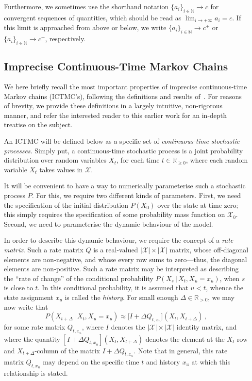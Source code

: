 \documentclass[3p]{elsarticle}
\newcommand{\nats}{\mathbb{N}}
\newcommand{\reals}{\mathbb{R}}
\newcommand{\realspos}{\reals_{>0}}
\newcommand{\realsnonneg}{\reals_{\geq 0}}
\newcommand{\states}{\mathcal{X}}
\begin{document}
Furthermore, we sometimes use the shorthand notation $\{a_i\}_{i\in\nats}\to c$ for convergent sequences of quantities, which should be read as $\lim_{i\to+\infty}a_i=c$. If this limit is approached from above or below, we write $\{a_i\}_{i\in\nats}\to c^+$ or $\{a_i\}_{i\in\nats}\to c^-$, respectively.


\subsection{Imprecise Continuous-Time Markov Chains}\label{subsec:ictmc}

We here briefly recall the most important properties of imprecise continuous-time Markov chains (ICTMC's), following the definitions and results of~\citet{krak2016ictmc}. For reasons of brevity, we provide these definitions in a largely intuitive, non-rigorous manner, and refer the interested reader to this earlier work for an in-depth treatise on the subject.

An ICTMC will be defined below as a specific set of \emph{continuous-time stochastic processes}. Simply put, a continuous-time stochastic process is a joint probability distribution over random variables $X_t$, for each time $t\in\realsnonneg$, where each random variable $X_t$ takes values in $\states$. 


It will be convenient to have a way to numerically parameterise such a stochastic process $P$. For this, we require two different kinds of parameters. First, we need the specification of the initial distribution $P(X_0)$ over the state at time zero; this simply requires the specification of some probability mass function on $\states_0$. Second, we need to parameterise the dynamic behaviour of the model.

In order to describe this dynamic behaviour, we require the concept of a \emph{rate matrix}. Such a rate matrix $Q$ is a real-valued $\lvert\states\rvert\times\lvert\states\rvert$ matrix, whose off-diagonal elements are non-negative, and whose every row sums to zero---thus, the diagonal elements are non-positive. Such a rate matrix may be interpreted as describing the ``rate of change'' of the conditional probability $P(X_s\,\vert\,X_t,X_u=x_u)$, when $s$ is close to $t$. In this conditional probability, it is assumed that $u<t$, whence the state assignment $x_u$ is called the \emph{history}. For small enough $\Delta\in\realspos$, we may now write that
\begin{equation*}
P(X_{t+\Delta}\,\vert\,X_t,X_u=x_u) \approx \bigl[I + \Delta Q_{t,x_u}\bigr](X_t, X_{t+\Delta})\,,
\end{equation*}
for some rate matrix $Q_{t,x_u}$, where $I$ denotes the $\lvert\states\rvert\times\lvert\states\rvert$ identity matrix, and where the quantity $[I + \Delta Q_{t,x_u}](X_t,X_{t+\Delta})$ denotes the element at the $X_t$-row and $X_{t+\Delta}$-column of the matrix $I + \Delta Q_{t,x_u}$. Note that in general, this rate matrix $Q_{t,x_u}$ may depend on the specific time $t$ and history $x_u$ at which this relationship is stated. 
\end{document}

